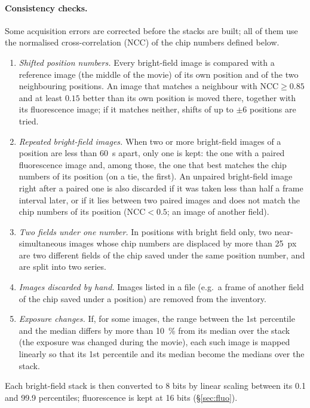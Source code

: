 \documentclass[11pt,a4paper]{article}
\begin{document}
\paragraph{Consistency checks.} Some acquisition errors are corrected before the stacks are built; all of them use the normalised cross-correlation (NCC) of the chip numbers defined below.
\begin{enumerate}[label=(\roman*)]
\item \emph{Shifted position numbers.} Every bright-field image is compared with a reference image (the middle of the movie) of its own position and of the two neighbouring positions. An image that matches a neighbour with $\mathrm{NCC}\ge0.85$ and at least $0.15$ better than its own position is moved there, together with its fluorescence image; if it matches neither, shifts of up to $\pm6$ positions are tried.
\item \emph{Repeated bright-field images.} When two or more bright-field images of a position are less than \SI{60}{\second} apart, only one is kept: the one with a paired fluorescence image and, among those, the one that best matches the chip numbers of its position (on a tie, the first). An unpaired bright-field image right after a paired one is also discarded if it was taken less than half a frame interval later, or if it lies between two paired images and does not match the chip numbers of its position ($\mathrm{NCC}<0.5$; an image of another field).
\item \emph{Two fields under one number.} In positions with bright field only, two near-simultaneous images whose chip numbers are displaced by more than \SI{25}{px} are two different fields of the chip saved under the same position number, and are split into two series.
\item \emph{Images discarded by hand.} Images listed in a file (e.g.\ a frame of another field of the chip saved under a position) are removed from the inventory.
\item \emph{Exposure changes.} If, for some images, the range between the 1st percentile and the median differs by more than \SI{10}{\percent} from its median over the stack (the exposure was changed during the movie), each such image is mapped linearly so that its 1st percentile and its median become the medians over the stack.
\end{enumerate}
Each bright-field stack is then converted to 8 bits by linear scaling between its \num{0.1} and \num{99.9} percentiles; fluorescence is kept at 16 bits (\S\ref{sec:fluo}).
\end{document}
